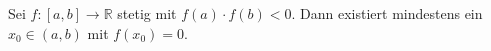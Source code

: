 Sei $f: [a, b] \to \mathbb{R}$ stetig mit $f(a) \cdot f(b) < 0$. Dann existiert mindestens ein $x_0 \in (a, b)$ mit $f(x_0) = 0$.